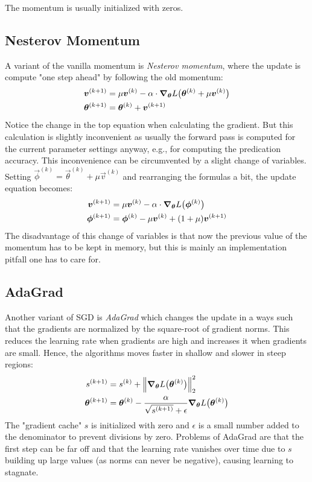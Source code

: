 		The momentum is usually initialized with zeros.

		\subsection{Nesterov Momentum}
			A variant of the vanilla momentum is \emph{Nesterov momentum}, where the update is compute "one step ahead" by following the old momentum:
			\begin{align}
				\bm{v}^{(k + 1)} &= \mu \bm{v}^{(k)} - \alpha \cdot \grad_{\bm{\theta}} L\big( \bm{\theta}^{(k)} + \mu \bm{v}^{(k)} \big) \\
				\bm{\theta}^{(k + 1)} &= \bm{\theta}^{(k)} + \bm{v}^{(k + 1)}
			\end{align}
			Notice the change in the top equation when calculating the gradient. But this calculation is slightly inconvenient as usually the forward pass is computed for the current parameter settings anyway, e.g., for computing the predication accuracy. This inconvenience can be circumvented by a slight change of variables. Setting \( \vec{\phi}^{(k)} = \vec{\theta}^{(k)} + \mu \vec{v}^{(k)} \) and rearranging the formulas a bit, the update equation becomes:
			\begin{align}
				\bm{v}^{(k + 1)} &= \mu \bm{v}^{(k)} - \alpha \cdot \grad_{\bm{\theta}} L\big(\bm{\phi}^{(k)}\big) \\
				\bm{\phi}^{(k + 1)} &= \bm{\phi}^{(k)} - \mu \bm{v}^{(k)} + (1 + \mu) \bm{v}^{(k + 1)}
			\end{align}
			The disadvantage of this change of variables is that now the previous value of the momentum has to be kept in memory, but this is mainly an implementation pitfall one has to care for.

		\subsection{AdaGrad}
			Another variant of SGD is \emph{AdaGrad} which changes the update in a ways such that the gradients are normalized by the square-root of gradient norms. This reduces the learning rate when gradients are high and increases it when gradients are small. Hence, the algorithms moves faster in shallow and slower in steep regions:
			\begin{align}
				s^{(k + 1)} &= s^{(k)} + \Big\lVert \grad_{\bm{\theta}} L\big(\bm{\theta}^{(k)}\big) \Big\rVert_2^2 \\
				\bm{\theta}^{(k + 1)} &= \bm{\theta}^{(k)} - \frac{\alpha}{\sqrt{s^{(k + 1)}} + \epsilon} \grad_{\bm{\theta}} L\big(\bm{\theta}^{(k)}\big)
			\end{align}
			The "gradient cache" \(s\) is initialized with zero and \(\epsilon\) is a small number added to the denominator to prevent divisions by zero. Problems of AdaGrad are that the first step can be far off and that the learning rate vanishes over time due to \(s\) building up large values (as norms can never be negative), causing learning to stagnate.

